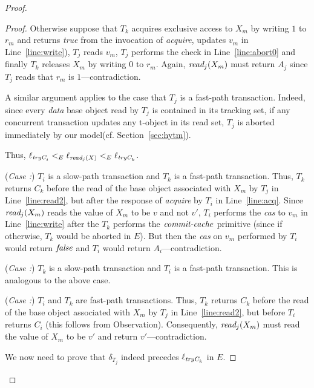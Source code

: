\begin{proof}
\begin{proof}
Otherwise suppose that $T_k$ acquires exclusive access to $X_m$ by writing $1$ to $r_{m}$ and returns \emph{true}
from the invocation of \emph{acquire}, updates $v_m$ in Line~\ref{line:write}), 
$T_j$ reads $v_m$, $T_j$ performs the check in Line~\ref{line:abort0} and finally $T_k$ 
releases $X_m$ by writing $0$ to $r_{m}$. 
Again, $\textit{read}_j(X_m)$ must return $A_j$ since $T_j$ reads that $r_{m}$ is $1$---contradiction.

A similar argument applies to the case that $T_j$ is a fast-path transaction.
Indeed, since every \emph{data} base object read by $T_j$ is contained in its tracking set, if any concurrent
transaction updates any t-object in its read set, $T_j$ is aborted immediately by our model(cf. Section~\ref{sec:hytm}).

Thus, $\ell_{\textit{tryC}_i} <_E \ell_{\textit{read}_j(X)} <_{E} \ell_{\textit{tryC}_k}$.

(\textit{Case :}) $T_i$ is a slow-path transaction and $T_k$ is a fast-path transaction.
Thus, $T_k$ returns $C_k$ 
before the read of the base object associated with $X_m$ by $T_j$ in Line~\ref{line:read2}, but after the response
of \emph{acquire} by $T_i$ in Line~\ref{line:acq}.
Since $\textit{read}_j(X_m)$ reads the value of $X_m$ to be $v$ and not $v'$, $T_i$ performs the \emph{cas}
to $v_m$ in Line~\ref{line:write} after the $T_k$ performs the $\ms{commit-cache}$ primitive (since if
otherwise, $T_k$ would be aborted in $E$).
But then the \emph{cas} on $v_m$ performed by $T_i$ would return $\mathit{false}$ and $T_i$ would return $A_i$---contradiction.

(\textit{Case :}) $T_k$ is a slow-path transaction and $T_i$ is a fast-path transaction.
This is analogous to the above case.

(\textit{Case :}) $T_i$ and $T_k$ are fast-path transactions.
Thus, $T_k$ returns $C_k$ 
before the read of the base object associated with $X_m$ by $T_j$ in Line~\ref{line:read2}, but before $T_i$
returns $C_i$ (this follows from Observation).
Consequently, $\textit{read}_j(X_m)$ must read the value of $X_m$ to be $v'$ and return $v'$---contradiction.
%

We now need to prove that $\delta_{T_{j}}$ indeed precedes $\ell_{\textit{tryC}_k}$ in $E$.


\end{proof}
\end{proof}
